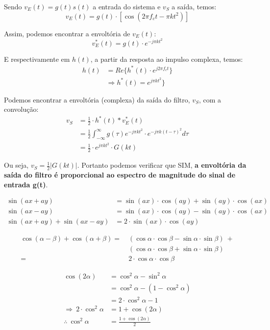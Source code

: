 Sendo $v_E(t) = g(t)s(t)$ a entrada do sistema e $v_S$ a saída, temos:
$$
    v_E(t) = g(t) \cdot [\cos(2\pi f_c t - \pi kt^2)]
$$

Assim, podemos encontrar a envoltória de $v_E(t)$:
$$
    v_E^*(t) = g(t) \cdot e^{-j\pi kt^2}
$$

E respectivamente em $h(t)$, a partir da resposta ao impulso complexa, temos:
\begin{align*}
    h(t) &= Re\{ h^*(t) \cdot e^{j2\pi f_c t}\}\\
    & \Rightarrow h^*(t) = e^{j\pi kt^2}\}
\end{align*}

Podemos encontrar a envoltória (complexa) da saída do filtro, $v_S$, com a convolução:
\begin{align*}
    v_S &= \frac{1}{2} \cdot h^*(t) * v_E^*(t)\\
    &= \frac{1}{2} \int_{-\infty}^\infty g(\tau) e^{-j\pi k t^2} \cdot e^{{-j\pi k(t-\tau)}^2} d\tau\\
    & = \frac{1}{2} \cdot e^{j\pi kt^2} \cdot G(kt)
\end{align*}

Ou seja, $v_S = \frac{1}{2}|G(kt)|$. Portanto podemos verificar que SIM, \textbf{a envoltória da saída do filtro é proporcional ao espectro de magnitude do sinal de entrada g(t)}.

    
\appendix
\appendixpage

\begin{equation}
    \begin{split}
        \sin(ax + ay) & = \sin(ax) \cdot \cos(ay) + \sin(ay) \cdot \cos(ax)\\
        \sin(ax - ay) & = \sin(ax) \cdot \cos(ay) - \sin(ay) \cdot \cos(ax)\\
        \sin(ax + ay) + \sin(ax - ay) & = 2 \cdot \sin(ax) \cdot \cos(ay)    
    \end{split}
\end{equation}

\begin{equation}\label{eq:2}
    \begin{split}
        \cos( \alpha - \beta ) + \cos( \alpha + \beta ) = &~(\cos\alpha \cdot \cos\beta - \sin\alpha \cdot \sin\beta) ~+ \\
        &~ (\cos\alpha \cdot \cos\beta + \sin\alpha \cdot \sin\beta)\\
        = & ~2 \cdot \cos\alpha \cdot \cos\beta
    \end{split}
\end{equation}

\begin{equation}\label{eq:3}
    \begin{split}
        \cos(2\alpha) &= \cos^2\alpha - \sin^2\alpha\\
        &= \cos^2\alpha - (1 - \cos^2\alpha)\\
        &= 2\cdot \cos^2\alpha - 1\\
        \Rightarrow ~2\cdot \cos^2\alpha &= 1 + \cos(2\alpha)\\
        \therefore ~\cos^2\alpha &= \frac{1 + \cos(2\alpha)}{2}
    \end{split}
\end{equation}

